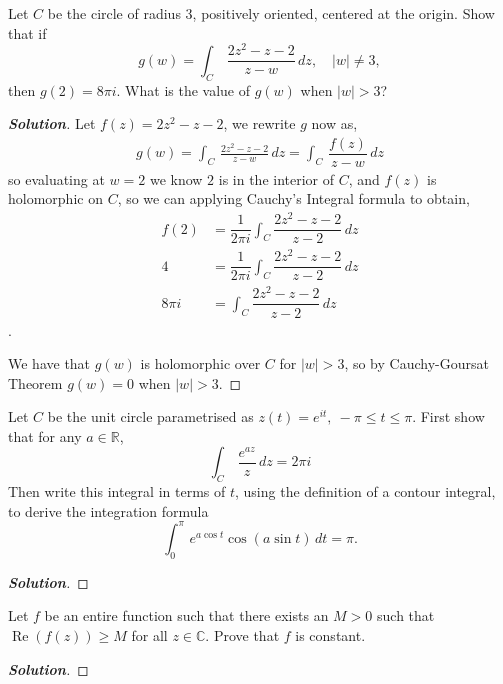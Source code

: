 \documentclass[11pt]{article}
\newenvironment{problem}[2][Problem\!]{\begin{trivlist}
\item[\hskip \labelsep {\bfseries #1}\hskip \labelsep {\bfseries #2}]}{\end{trivlist}}
\newenvironment{solution}{\begin{proof}[\textbf{\textit{Solution}}] }{\end{proof}}
\newcommand{\rr}{\mathbb R}   %
\newcommand{\cc}{\mathbb C}   %
\newcommand{\abs}[1]{\left\lvert#1\right\rvert} %
\renewcommand{\geq}{\geqslant}
\renewcommand{\leq}{\leqslant}
\renewcommand{\Re}{\operatorname{Re}}
\begin{document}
\begin{problem}{8.2}
Let $C$ be the circle of radius $3$, positively oriented, centered at the origin. Show that if
\[g(w) = \int_C\, \frac{2z^2 - z - 2}{z - w}\,dz,\quad \abs{w} \neq 3,\]
then $g(2) = 8\pi i$. What is the value of $g(w)$ when $|w| > 3$?
\end{problem}
\begin{solution}
    Let $f(z) = 2z^{2} -z - 2$, we rewrite $g$ now as,
    \begin{align*}
        g(w) = \int_C\, \frac{2z^2 - z - 2}{z - w}\,d z = \int_C\, \dfrac{f(z)}{z - w} \, d z 
    \end{align*}
    so evaluating at $w = 2$ we know $2$ is in the interior of $C$, and $f(z)$ is holomorphic on $C$, so we can applying Cauchy's Integral formula to obtain,
    \begin{align*}
        f(2) &= \dfrac{1}{2\pi i}\int_C \dfrac{2z^{2} - z -2}{z - 2 }\, d z  \\
        4 &= \dfrac{1}{2\pi i} \int_C \dfrac{2z^{2} - z -2}{z - 2 }\, d z \\
        8\pi i &=  \int_C \dfrac{2z^{2} - z -2}{z - 2 }\, d z
    \end{align*}.

    We have that $g(w)$ is holomorphic over $C$ for $\abs{w} > 3$, so by Cauchy-Goursat Theorem $g(w) = 0$ when $\abs{w} > 3$.
\end{solution}

\newpage  %

\begin{problem}{8.3}
Let $C$ be the unit circle parametrised as $z(t) = e^{it},\  -\pi \leq t \leq \pi$. First show that for any $a \in \rr$,
\[\int_C\, \frac{e^{az}}{z}\,dz = 2\pi i\]
Then write this integral in terms of $t$, using the definition of a contour integral, to derive the integration formula
\[\int_0^\pi\, e^{a\cos t}\cos(a\sin t)\,dt = \pi.\]
\end{problem}
\begin{solution}
\end{solution}

\newpage  %

\begin{problem}{8.4}
Let $f$ be an entire function such that there exists an $M > 0$ such that $\Re(f(z)) \geq M$ for all $z \in \cc$. Prove that $f$ is constant. 
\end{problem}
\begin{solution}
\end{solution}
\end{document}
